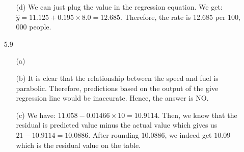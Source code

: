 \documentclass[11pt, a4paper]{article}
\begin{document}
\begin{itemize}
\begin{itemize}
\item[]

\item[(d)]
We can just plug the value in the regression equation.
We get: $\hat{y} = 11.125 + 0.195 \times 8.0 = 12.685$.
Therefore, the rate is 12.685 per 100, 000 people.
\end{itemize}

\newpage

\item[5.9]
\begin{itemize}
\item[(a)]
\item[]
\item[]
\begin{center}
\end{center}

\item[]

\item[(b)]
It is clear that the relationship between the speed and fuel
is parabolic. Therefore, predictions based on the output of
the give regression line would be inaccurate. Hence,
the answer is NO.

\item[]

\item[(c)]
We have: $11.058 - 0.01466 \times 10 = 10.9114$.
Then, we know that the residual is predicted
value minus the actual value which gives us $21 - 10.9114 = 10.0886$.
After rounding $10.0886$, we indeed get $10.09$ which is the
residual value on the table.
\end{itemize}

\item[]



\end{itemize}
\end{document}
